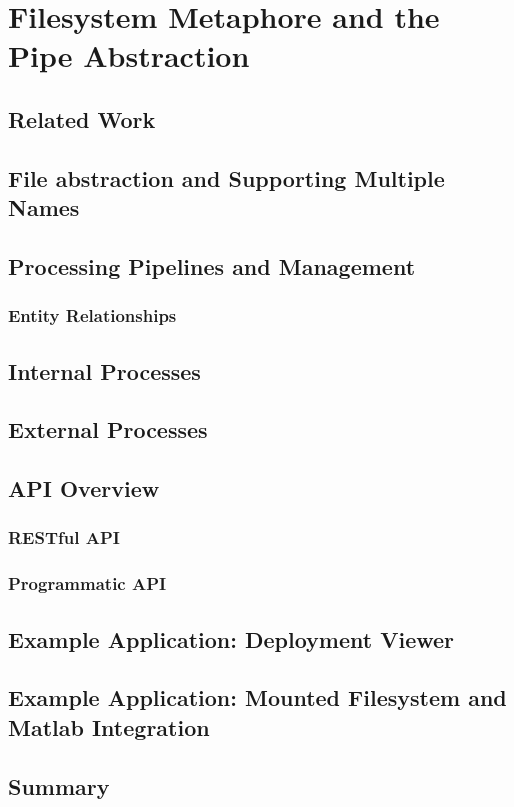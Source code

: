 \chapter{Filesystem Metaphore and the Pipe Abstraction}
\section{Related Work}
\section{File abstraction and Supporting Multiple Names}
\section{Processing Pipelines and Management}
	\subsection{Entity Relationships}
\section{Internal Processes}
\section{External Processes}
\section{API Overview}
	\subsection{RESTful API}
	\subsection{Programmatic API}
\section{Example Application: Deployment Viewer}
\section{Example Application: Mounted Filesystem and Matlab Integration}
\section{Summary}


